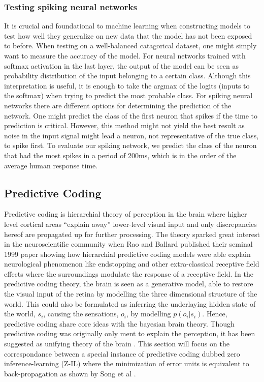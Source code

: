 \documentclass[a4paper,11pt]{article} %
\begin{document}
\subsubsection{Testing spiking neural networks}
It is crucial and foundational to machine learning when constructing models to test how well they generalize on new data that the model has not been exposed to before. When testing on a well-balanced catagorical dataset, one might simply want to measure the accuracy of the model. For neural networks trained with softmax activation in the last layer, the output of the model can be seen as probability distribution of the input belonging to a certain class. Although this interpretation is useful, it is enough to take the argmax of the logits (inputs to the softmax) when trying to predict the most probable class. For spiking neural networks there are different options for determining the prediction of the network. One might predict the class of the first neuron that spikes if the time to prediction is critical. However, this method might not yield the best result as noise in the input signal might lead a neuron, not representative of the true class, to spike first. To evaluate our spiking network, we predict the class of the neuron that had the most spikes in a period of 200ms, which is in the order of the average human response time. 

\subsection{Predictive Coding}
Predictive coding is hierarchial theory of perception in the brain where higher level cortical areas ``explain away'' lower-level visual input and only discrepancies hereof are propagated up for further processing. The theory sparked great interest in the neuroscientific community when Rao and Ballard published their seminal 1999 paper \cite{raoballard1999} showing how hierarchial predictive coding models were able explain neurological phenomenon like endstopping and other extra-classical receptive field effects where the surroundings modulate the response of a receptive field. In the predictive coding theory, the brain is seen as a generative model, able to restore the visual input of the retina by modelling the three dimensional structure of the world. This could also be formulated as inferring the underlaying hidden state of the world, $s_i$, causing the sensations, $o_i$, by modelling $p(o_i | s_i)$. Hence, predictive coding share core ideas with the bayesian brain theory. Though predictive coding was originally only ment to explain the perception, it has been suggested as unifying theory of the brain \cite{millidge2021predictive}. This section will focus on the correspondance between a special instance of predictive coding dubbed zero inference-learning (Z-IL) where the minimization of error units is equivalent to back-propagation as shown by Song et al \cite{PredictiveCodingNetworks}.
\end{document}
